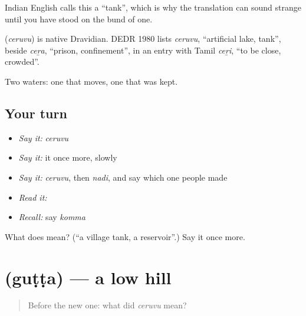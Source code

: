 Indian English calls this a \textquotedblleft{}tank\textquotedblright{}, which is why the translation can sound strange until you have stood on the bund of one.

\begin{cousinweb}
\textbf{} (\emph{ceruvu}) is native Dravidian. DEDR 1980 lists \emph{ceruvu}, \textquotedblleft{}artificial lake, tank\textquotedblright{}, beside \emph{ceṟa}, \textquotedblleft{}prison, confinement\textquotedblright{}, in an entry with Tamil \emph{ceṟi}, \textquotedblleft{}to be close, crowded\textquotedblright{}.
\end{cousinweb}

\begin{grammarlens}[title={What you've built}]
Two waters: one that moves, one that was kept.
\end{grammarlens}

\subsection*{Your turn}
\begin{itemize}
\raggedright
  \item \emph{Say it:} \emph{ceruvu}
  \item \emph{Say it:} it once more, slowly
  \item \emph{Say it:} \emph{ceruvu}, then \emph{nadi}, and say which one people made
  \item \emph{Read it:} \textbf{}
  \item \emph{Recall:} say \emph{komma}
\end{itemize}

\begin{tcolorbox}[breakable,colback=teal!4,colframe=teal!35!black,title={Before you move on}]
What does  mean? (\textquotedblleft{}a village tank, a reservoir\textquotedblright{}.) Say it once more.
\end{tcolorbox}
\section[\texorpdfstring{\te{గుట్ట} (guṭṭa)}{గుట్ట (guṭṭa)}]{ (guṭṭa) — a low hill}

\label{lesson:TE-C55-hill}



\begin{quote}
Before the new one: what did \emph{ceruvu} mean?
\end{quote}

